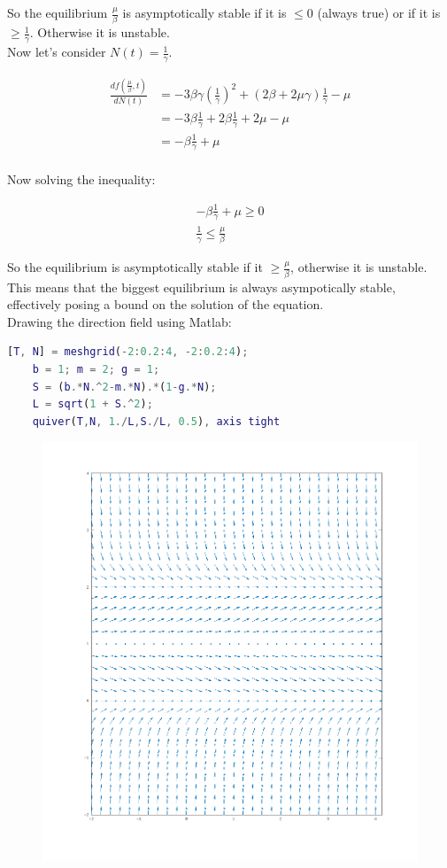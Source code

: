   So the equilibrium $\frac{\mu}{\beta}$ is asymptotically stable if it is $\le 0$ (always true) or if it is $\ge\frac{1}{\gamma}$.
  Otherwise it is unstable.\\
  Now let's consider $N(t) = \frac{1}{\gamma}$.

  \begin{align*}
    \frac{df(\frac{\mu}{\beta}, t)}{dN(t)} &= -3\beta\gamma\left(\frac{1}{\gamma}\right)^2 + (2\beta + 2\mu\gamma)\frac{1}{\gamma} - \mu\\
                                           &=-3\beta\frac{1}{\gamma} + 2\beta\frac{1}{\gamma} + 2\mu -\mu\\
                                           &=-\beta\frac{1}{\gamma} +\mu\\
  \end{align*}

  Now solving the inequality:

  \begin{align*}
    -\beta\frac{1}{\gamma} +\mu \ge 0\\
    \frac{1}{\gamma}\le \frac{\mu}{\beta}
  \end{align*}

  So the equilibrium is asymptotically stable if it $\ge\frac{\mu}{\beta}$, otherwise it is unstable.\\
  This means that the biggest equilibrium is always asympotically stable, effectively posing a bound on the solution of the equation.\\
  Drawing the direction field using Matlab:

  \begin{lstlisting}[language=Matlab]
    [T, N] = meshgrid(-2:0.2:4, -2:0.2:4);
    b = 1; m = 2; g = 1;
    S = (b.*N.^2-m.*N).*(1-g.*N);
    L = sqrt(1 + S.^2);
    quiver(T,N, 1./L,S./L, 0.5), axis tight
  \end{lstlisting}

  \begin{figure}[H]
    \centering
    \includegraphics[width=\textwidth/2]{04_direction_field}
  \end{figure}
